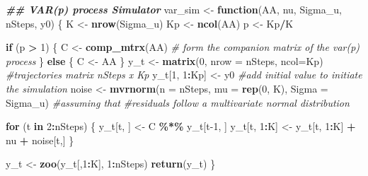 \documentclass[
]{article}
\newenvironment{Shaded}{\begin{snugshade}}{\end{snugshade}}
\newcommand{\AttributeTok}[1]{\textcolor[rgb]{0.13,0.29,0.53}{#1}}
\newcommand{\CommentTok}[1]{\textcolor[rgb]{0.56,0.35,0.01}{\textit{#1}}}
\newcommand{\ControlFlowTok}[1]{\textcolor[rgb]{0.13,0.29,0.53}{\textbf{#1}}}
\newcommand{\DecValTok}[1]{\textcolor[rgb]{0.00,0.00,0.81}{#1}}
\newcommand{\DocumentationTok}[1]{\textcolor[rgb]{0.56,0.35,0.01}{\textbf{\textit{#1}}}}
\newcommand{\FunctionTok}[1]{\textcolor[rgb]{0.13,0.29,0.53}{\textbf{#1}}}
\newcommand{\NormalTok}[1]{#1}
\newcommand{\OtherTok}[1]{\textcolor[rgb]{0.56,0.35,0.01}{#1}}
\newcommand{\SpecialCharTok}[1]{\textcolor[rgb]{0.81,0.36,0.00}{\textbf{#1}}}
\begin{document}
\begin{Shaded}
\begin{Highlighting}[]
\DocumentationTok{\#\# VAR(p) process Simulator}
\NormalTok{var\_sim }\OtherTok{\textless{}{-}} \ControlFlowTok{function}\NormalTok{(AA, nu, Sigma\_u, nSteps, y0) \{}
\NormalTok{    K }\OtherTok{\textless{}{-}} \FunctionTok{nrow}\NormalTok{(Sigma\_u)}
\NormalTok{    Kp }\OtherTok{\textless{}{-}} \FunctionTok{ncol}\NormalTok{(AA)}
\NormalTok{    p }\OtherTok{\textless{}{-}}\NormalTok{ Kp}\SpecialCharTok{/}\NormalTok{K}
        
    \ControlFlowTok{if}\NormalTok{ (p }\SpecialCharTok{\textgreater{}} \DecValTok{1}\NormalTok{) \{}
\NormalTok{        C }\OtherTok{\textless{}{-}} \FunctionTok{comp\_mtrx}\NormalTok{(AA) }\CommentTok{\# form the  companion matrix of the var(p) process}
\NormalTok{    \} }\ControlFlowTok{else}\NormalTok{ \{}
\NormalTok{        C }\OtherTok{\textless{}{-}}\NormalTok{ AA  }
\NormalTok{    \}}
\NormalTok{    y\_t }\OtherTok{\textless{}{-}} \FunctionTok{matrix}\NormalTok{(}\DecValTok{0}\NormalTok{, }\AttributeTok{nrow =}\NormalTok{  nSteps, }\AttributeTok{ncol=}\NormalTok{Kp) }\CommentTok{\#trajectories matrix nSteps x Kp}
\NormalTok{    y\_t[}\DecValTok{1}\NormalTok{, }\DecValTok{1}\SpecialCharTok{:}\NormalTok{Kp] }\OtherTok{\textless{}{-}}\NormalTok{ y0 }\CommentTok{\#add initial value to initiate the simulation}
\NormalTok{    noise }\OtherTok{\textless{}{-}} \FunctionTok{mvrnorm}\NormalTok{(}\AttributeTok{n =}\NormalTok{ nSteps, }\AttributeTok{mu =} \FunctionTok{rep}\NormalTok{(}\DecValTok{0}\NormalTok{, K), }\AttributeTok{Sigma =}\NormalTok{ Sigma\_u) }\CommentTok{\#assuming that }
    \CommentTok{\#residuals follow a multivariate normal distribution    }
    
    \ControlFlowTok{for}\NormalTok{ (t }\ControlFlowTok{in} \DecValTok{2}\SpecialCharTok{:}\NormalTok{nSteps) \{}
\NormalTok{        y\_t[t, ] }\OtherTok{\textless{}{-}}\NormalTok{ C }\SpecialCharTok{\%*\%}\NormalTok{ y\_t[t}\DecValTok{{-}1}\NormalTok{, ]}
\NormalTok{        y\_t[t, }\DecValTok{1}\SpecialCharTok{:}\NormalTok{K] }\OtherTok{\textless{}{-}}\NormalTok{ y\_t[t, }\DecValTok{1}\SpecialCharTok{:}\NormalTok{K] }\SpecialCharTok{+}\NormalTok{ nu }\SpecialCharTok{+}\NormalTok{ noise[t,]}
\NormalTok{    \}}
    
\NormalTok{    y\_t }\OtherTok{\textless{}{-}} \FunctionTok{zoo}\NormalTok{(y\_t[,}\DecValTok{1}\SpecialCharTok{:}\NormalTok{K], }\DecValTok{1}\SpecialCharTok{:}\NormalTok{nSteps)  }
    \FunctionTok{return}\NormalTok{(y\_t)}
\NormalTok{  \}}
\end{Highlighting}
\end{Shaded}
\end{document}

